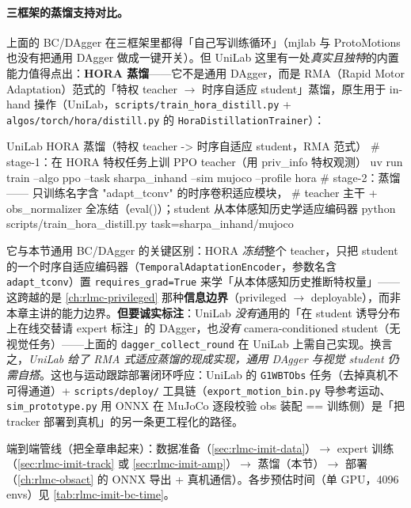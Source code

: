 \paragraph{三框架的蒸馏支持对比。}上面的 BC/DAgger 在三框架里都得「自己写训练循环」（mjlab 与 ProtoMotions 也没有把通用 DAgger 做成一键开关）。但 UniLab 这里有一处\emph{真实且独特}的内置能力值得点出：\textbf{HORA 蒸馏}——它不是通用 DAgger，而是 RMA（Rapid Motor Adaptation）范式的「特权 teacher $\to$ 时序自适应 student」蒸馏，原生用于 in-hand 操作（UniLab，\verb|scripts/train_hora_distill.py| + \verb|algos/torch/hora/distill.py| 的 \verb|HoraDistillationTrainer|）：

\begin{codebox}[bash]{UniLab HORA 蒸馏（特权 teacher -> 时序自适应 student，RMA 范式）}
# stage-1：在 HORA 特权任务上训 PPO teacher（用 priv_info 特权观测）
uv run train --algo ppo --task sharpa_inhand --sim mujoco --profile hora
# stage-2：蒸馏 —— 只训练名字含 "adapt_tconv" 的时序卷积适应模块，
#          teacher 主干 + obs_normalizer 全冻结（eval()）；student 从本体感知历史学适应编码器
python scripts/train_hora_distill.py task=sharpa_inhand/mujoco
\end{codebox}

它与本节通用 BC/DAgger 的关键区别：HORA \emph{冻结}整个 teacher，只把 student 的一个时序自适应编码器（\verb|TemporalAdaptationEncoder|，参数名含 \verb|adapt_tconv|）置 \verb|requires_grad=True| 来学「从本体感知历史推断特权量」——这跨越的是 \cref{ch:rlmc-privileged} 那种\textbf{信息边界}（privileged $\to$ deployable），而非本章主讲的能力边界。\textbf{但要诚实标注}：UniLab \emph{没有}通用的「在 student 诱导分布上在线交替请 expert 标注」的 DAgger，也\emph{没有} camera-conditioned student（无视觉任务）——上面的 \verb|dagger_collect_round| 在 UniLab 上需自己实现。换言之，\emph{UniLab 给了 RMA 式适应蒸馏的现成实现，通用 DAgger 与视觉 student 仍需自搭}。这也与运动跟踪部署闭环呼应：UniLab 的 \verb|G1WBTObs| 任务（去掉真机不可得通道）+ \verb|scripts/deploy/| 工具链（\verb|export_motion_bin.py| 导参考运动、\verb|sim_prototype.py| 用 ONNX 在 MuJoCo 逐段校验 obs 装配 == 训练侧）是「把 tracker 部署到真机」的另一条更工程化的路径。

端到端管线（把全章串起来）：数据准备（\cref{sec:rlmc-imit-data}）$\to$ expert 训练（\cref{sec:rlmc-imit-track} 或 \cref{sec:rlmc-imit-amp}）$\to$ 蒸馏（本节）$\to$ 部署（\cref{ch:rlmc-obsact} 的 ONNX 导出 + 真机通信）。各步预估时间（单 GPU，4096 envs）见 \cref{tab:rlmc-imit-bc-time}。


